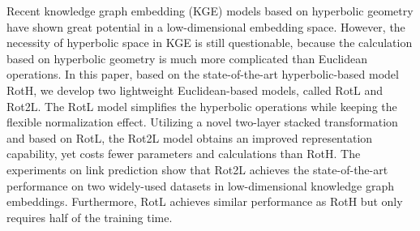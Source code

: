 Recent knowledge graph embedding (KGE) models based on hyperbolic geometry have shown great potential in a low-dimensional embedding space. However, the necessity of hyperbolic space in KGE is still questionable, because the calculation based on hyperbolic geometry is much more complicated than Euclidean operations. In this paper, based on the state-of-the-art hyperbolic-based model RotH, we develop two lightweight Euclidean-based models, called RotL and Rot2L. The RotL model simplifies the hyperbolic operations while keeping the flexible normalization effect. Utilizing a novel two-layer stacked transformation and based on RotL, the Rot2L model obtains an improved representation capability, yet costs fewer parameters and calculations than RotH. The experiments on link prediction show that Rot2L achieves the state-of-the-art performance on two widely-used datasets in low-dimensional knowledge graph embeddings. Furthermore, RotL achieves similar performance as RotH but only requires half of the training time.
